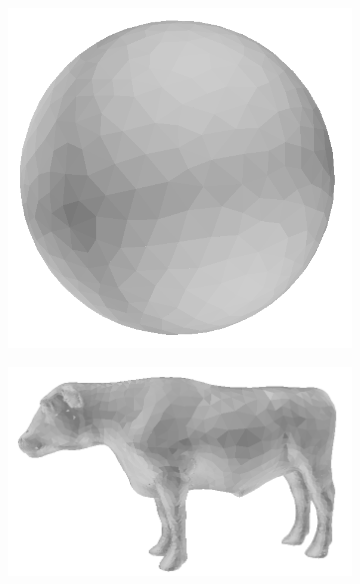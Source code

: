 \begin{figure}[th]
\centering
\begin{subfigure}{.24\textwidth}
  \centering
  \includegraphics[scale=0.12]{../Images/ball}
\end{subfigure}%
\begin{subfigure}{.24\textwidth}
  \centering
  \includegraphics[scale=0.12]{../Images/cow}
\end{subfigure}
\begin{subfigure}{.24\textwidth}

\end{subfigure}
\end{figure}
